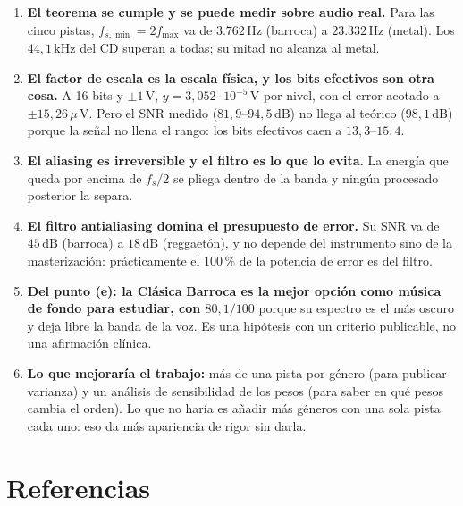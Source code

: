 \documentclass[11pt,a4paper]{article}
\newcommand{\fs}{f_s}
\newcommand{\fsmin}{f_{s,\min}}
\newcommand{\fmax}{f_{\max}}
\newcommand{\dB}{\,\mathrm{dB}}
\newcommand{\Hz}{\,\mathrm{Hz}}
\newcommand{\kHz}{\,\mathrm{kHz}}
\newcommand{\V}{\,\mathrm{V}}
\begin{document}
\begin{enumerate}
  \item \textbf{El teorema se cumple y se puede medir sobre audio real.} Para
        las cinco pistas, \(\fsmin = 2\fmax\) va de \(3.762\Hz\) (barroca) a
        \(23.332\Hz\) (metal). Los \(44{,}1\kHz\) del CD superan a todas; su
        mitad no alcanza al metal.

  \item \textbf{El factor de escala es la escala física, y los bits efectivos
        son otra cosa.} A 16 bits y \(\pm1\V\),
        \(y = 3{,}052\cdot10^{-5}\V\) por nivel, con el error acotado a
        \(\pm15{,}26\,\mu\V\). Pero el SNR medido (\(81{,}9\)--\(94{,}5\dB\)) no
        llega al teórico (\(98{,}1\dB\)) porque la señal no llena el rango: los
        bits efectivos caen a \(13{,}3\)--\(15{,}4\).

  \item \textbf{El aliasing es irreversible y el filtro es lo que lo evita.}
        La energía que queda por encima de \(\fs/2\) se pliega dentro de la
        banda y ningún procesado posterior la separa.

  \item \textbf{El filtro antialiasing domina el presupuesto de error.} Su SNR
        va de \(45\dB\) (barroca) a \(18\dB\) (reggaetón), y no depende del
        instrumento sino de la masterización: prácticamente el \(100\,\%\) de la potencia
        de error es del filtro.

  \item \textbf{Del punto (e): la Clásica\,\textperiodcentered{}\,Barroca es la mejor opción como
        música de fondo para estudiar, con \(80{,}1/100\)} porque su espectro
        es el más oscuro y deja libre la banda de la voz. Es una hipótesis con
        un criterio publicable, no una afirmación clínica.

  \item \textbf{Lo que mejoraría el trabajo:} más de una pista por género
        (para publicar varianza) y un análisis de sensibilidad de los pesos
        (para saber en qué pesos cambia el orden). Lo que no haría es añadir
        más géneros con una sola pista cada uno: eso da más apariencia de rigor
        sin darla.
\end{enumerate}

\section*{Referencias}
\end{document}
